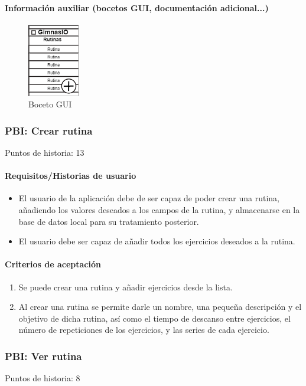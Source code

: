 \documentclass[11pt,a4paper]{report}
\begin{document}
\paragraph{Información auxiliar (bocetos GUI, documentación adicional...)}
\begin{figure}[H]
	\centering
	\includegraphics[width=0.2\textwidth]{capturicas/guipbiverrutinas.png}
	\caption{Boceto GUI}
	\label{fig: guipbi4}
\end{figure}
\subsubsection{PBI: Crear rutina}
Puntos de historia: 13
\paragraph{Requisitos/Historias de usuario}
\begin{itemize}
	\item El usuario de la aplicación debe de ser capaz de poder crear una rutina, añadiendo los valores deseados a los campos de la rutina, y almacenarse en la base de datos local para su tratamiento posterior.
	\item El usuario debe ser capaz de añadir todos los ejercicios deseados a la rutina.
\end{itemize}
\paragraph{Criterios de aceptación}
\begin{enumerate}
	\item Se puede crear una rutina y añadir ejercicios desde la lista.
	\item Al crear una rutina se permite darle un nombre, una pequeña descripción y el objetivo de dicha rutina, así como el tiempo de descanso entre ejercicios, el número de repeticiones de los ejercicios, y las series de cada ejercicio.
\end{enumerate}
\subsubsection{PBI: Ver rutina}
Puntos de historia: 8
\end{document}
